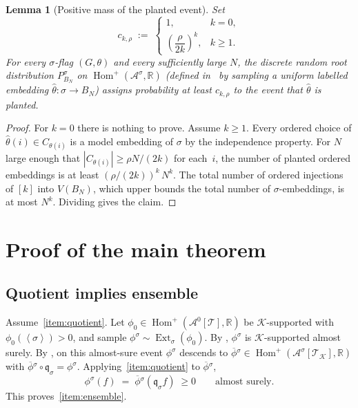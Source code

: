 \documentclass[11pt]{article}
\newtheorem{lemma}[theorem]{Lemma}
\theoremstyle{definition}
\newcommand{\R}{\mathbb{R}}
\newcommand{\A}{\mathcal{A}}
\newcommand{\K}{\mathcal{K}}
\newcommand{\T}{\mathcal{T}}
\newcommand{\Homp}{\operatorname{Hom}^{+}}
\newcommand{\Ext}{\operatorname{Ext}}
\newcommand{\brak}[1]{\left\langle #1\right\rangle}
\newcommand{\q}{\mathfrak{q}}
\begin{document}
\begin{lemma}[Positive mass of the planted event]\label{lem:positive-mass}
Set
\[
  c_{k,\rho}\;:=\;
  \begin{cases}
    1, & k=0,\\[1mm]
    \left(\dfrac{\rho}{2k}\right)^{\!k}, & k\ge 1.
  \end{cases}
\]
For every $\sigma$-flag $(G,\theta)$ and every sufficiently large $N$,
the discrete random root distribution $P^\sigma_{B_N}$ on
$\Homp(\A^\sigma,\R)$ (defined in~\cite[Definition~9]{Razborov2007} by
sampling a uniform labelled embedding $\widehat\theta\colon\sigma\to B_N$)
assigns probability at least $c_{k,\rho}$ to the event that
$\widehat\theta$ is planted.
\end{lemma}

\begin{proof}
For $k=0$ there is nothing to prove.  Assume $k\ge 1$.  Every ordered
choice of $\widehat\theta(i)\in C_{\theta(i)}$ is a model embedding of
$\sigma$ by the independence property.  For $N$ large enough that
$|C_{\theta(i)}|\ge\rho N/(2k)$ for each~$i$, the number of planted
ordered embeddings is at least $(\rho/(2k))^k\,N^k$.  The total number
of ordered injections of $[k]$ into $V(B_N)$, which upper bounds the
total number of $\sigma$-embeddings, is at most $N^k$.  Dividing gives
the claim.
\end{proof}

\section{Proof of the main theorem}\label{sec:proof}

\subsection{Quotient implies ensemble}

Assume~\ref{item:quotient}.  Let $\phi_0\in\Homp(\A^0[\T],\R)$ be
$\K$-supported with $\phi_0(\brak\sigma)>0$, and sample
$\phi^\sigma\sim\Ext_\sigma(\phi_0)$.  By ,
$\phi^\sigma$ is $\K$-supported almost surely.  By
, on this almost-sure event $\phi^\sigma$
descends to $\overline{\phi}{}^\sigma\in\Homp(\A^\sigma[\T_\K],\R)$
with $\overline{\phi}{}^\sigma\circ\q_\sigma=\phi^\sigma$.
Applying~\ref{item:quotient} to $\overline{\phi}{}^\sigma$,
\[
  \phi^\sigma(f)
  \;=\;\overline{\phi}{}^\sigma(\q_\sigma f)
  \;\ge 0
  \qquad\text{almost surely.}
\]
This proves~\ref{item:ensemble}.
\end{document}
